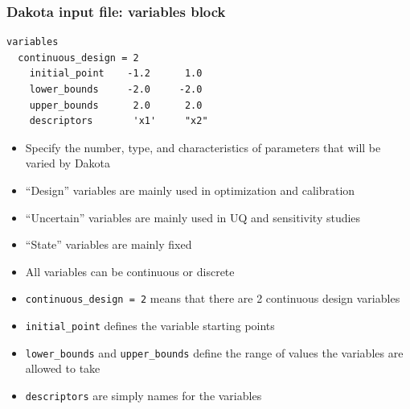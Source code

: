 \documentclass[t]{beamer}
\begin{document}

\begin{frame}[fragile]
  \frametitle{Dakota input file: variables block}
  \begin{small}\begin{lstlisting}
variables
  continuous_design = 2
    initial_point    -1.2      1.0
    lower_bounds     -2.0     -2.0
    upper_bounds      2.0      2.0
    descriptors       'x1'     "x2"\end{lstlisting}\end{small}
  \begin{footnotesize}\begin{itemize}
    \item Specify the number, type, and characteristics of parameters that will
          be varied by Dakota
    \item ``Design'' variables are mainly used in optimization and calibration
    \item ``Uncertain'' variables are mainly used in UQ and sensitivity studies
    \item ``State'' variables are mainly fixed
    \item All variables can be continuous or discrete
    \item \lstinline{continuous_design = 2} means that there are 2 continuous
          design variables
    \item \lstinline{initial_point} defines the variable starting points
    \item \lstinline{lower_bounds} and \lstinline{upper_bounds} define the range
          of values the variables are allowed to take
    \item \lstinline{descriptors} are simply names for the variables
  \end{itemize}\end{footnotesize}
\end{frame}

\end{document}

